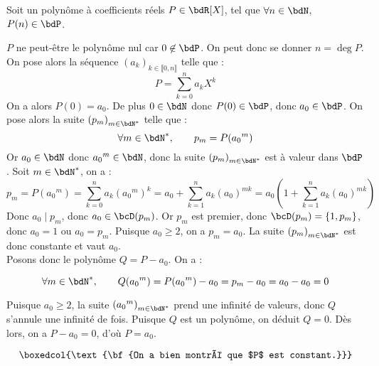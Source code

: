 \documentclass[a4paper,french,bookmarks]{article}
\begin{document}

\begin{exercise}{}{}
    Soit un polynôme à coefficients réels $P \in \bdR[X]$, tel que $\forall n \in \bdN$, $P(n) \in \bdP$. 
    
    \tcblower
    
    $P$ ne peut-être le polynôme nul car $0 \not\in \bdP$. On peut donc se donner $n = \deg P$. On pose alors la séquence $(a_k)_{k \in \llbracket0, n\rrbracket}$ telle que :
    \[ P = \sum_{k=0}^n a_kX^k\]
    On a alors $P(0) = a_0$. De plus $0 \in \bdN$ donc $P(0) \in \bdP$, donc $a_0 \in \bdP$. On pose alors la suite $\left(p_m\right)_{m \in \bdN^*}$ telle que :
    \[ \forall m \in \bdN^*,\qquad p_m = P({a_0}^m)\]
    Or $a_0 \in \bdN$ donc ${a_0}^m \in \bdN$, donc la suite $\left(p_m\right)_{m \in \bdN^*}$ est à valeur dans $\bdP$. Soit $m \in \bdN^*$, on a :
    \[ p_m = P({a_0}^m) =  \sum_{k=0}^n a_k \left({a_0}^m\right)^k = a_0 + \sum_{k=1}^n a_k (a_0)^{mk} = a_0\left(1 + \sum_{k=1}^n a_k (a_0)^{mk}\right)\]
    Donc $a_0 \mid p_m$, donc $a_0 \in \bcD(p_m)$. Or $p_m$ est premier, donc $\bcD(p_m) = \{1, p_m\}$, donc $a_0 = 1$ ou $a_0 = p_m$. Puisque $a_0 \geq 2$, on a $p_m = a_0$. La suite $\left(p_m\right)_{m \in \bdN^*}$ est donc constante et vaut $a_0$.\\
    
    Posons donc le polynôme $Q = P - a_0$. On a :
    
    \[ \forall m \in \bdN^*,\qquad Q({a_0}^m) = P({a_0}^m) - a_0 = p_m - a_0 = a_0 - a_0 = 0\]
    
    Puisque $a_0 \geq 2$, la suite $\left({a_0}^m\right)_{m \in \bdN^*}$ prend une infinité de valeurs, donc $Q$ s'annule une infinité de fois. Puisque $Q$ est un polynôme, on déduit $Q = 0$. Dès lors, on a $P - a_0 = 0$, d'où $P = a_0$.
    
    \[ \boxedcol{\text{\bf{On a bien montré que $P$ est constant.}}} \]
\end{exercise}

\newpage
\end{document}
